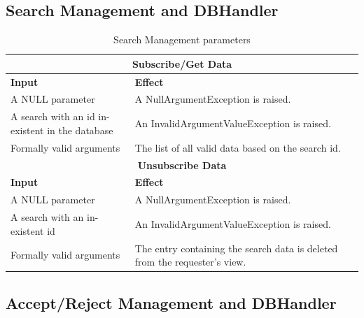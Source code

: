 \documentclass[a4paper, hidelinks, 12pt]{report}
\begin{document}
	\subsection{Search Management and DBHandler}

\begin{table}[h]
		\centering
		\begin{tabular}{|p{6cm}|p{9cm}|}
			\hline\hline
			\multicolumn{2}{c}{\textbf{Subscribe/Get Data}} \\
			\hline
			\textbf{Input} & \textbf{Effect} \\ [0.5ex]
			\hline
			A NULL parameter & A NullArgumentException is raised.  \\
			\hline
			A search with an id in-existent in the database & An InvalidArgumentValueException is raised.\\
			\hline
			Formally valid arguments & The list of all valid data based on the search id.\\
			\hline\hline
			\multicolumn{2}{c}{\textbf{Unsubscribe Data}} \\
			\hline
			\textbf{Input} & \textbf{Effect} \\ [0.5ex]
			\hline
			A NULL parameter & A NullArgumentException is raised.  \\
			\hline
			A search with an in-existent id & An InvalidArgumentValueException is raised.\\
			\hline
			Formally valid arguments & The entry containing the search data is deleted from the requester's view.\\
			\hline
			
		\end{tabular}
		\caption{Search Management parameters}
		\label{fig:Search Management parameters}
	\end{table}
	
	\subsection{Accept/Reject Management and DBHandler}
\end{document}
